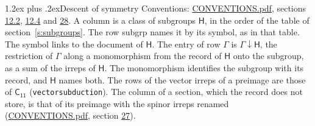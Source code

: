 \documentclass[10pt,a4paper]{article}
\makeatletter
\renewcommand\section{\@startsection{section}{1}{\z@}{-3ex plus -1ex minus -.2ex}%
  {1.2ex plus .2ex}{\normalfont\large\sffamily\bfseries\color{parttitle}}}
\numberwithin{equation}{section}
\newcommand{\grp}[1]{\mathsf{#1}}
\newcommand{\restr}[2]{#1\!\downarrow#2}
\makeatother
\begin{document}
\section{Descent of symmetry}\label{s:subduction}
Conventions: \href{../../CONVENTIONS.pdf}{CONVENTIONS.pdf}, sections \href{../../../rotation/CONVENTIONS.pdf\#conv.12.2}{12.2}, \href{../../../rotation/CONVENTIONS.pdf\#conv.12.4}{12.4} and \href{../../CONVENTIONS.pdf\#conv.28}{28}.
A column is a class of subgroups $\grp{H}$, in the order of the table of section~\ref{s:subgroups}. The row subgrp names it by its symbol, as in that table. The symbol links to the document of $\grp{H}$. The entry of row $\Gamma$ is $\restr{\Gamma}{\grp{H}}$, the restriction of $\Gamma$ along a monomorphism from the record of $\grp{H}$ onto the subgroup, as a sum of the irreps of $\grp{H}$. The monomorphism identifies the subgroup with its record, and $\grp{H}$ names both. The rows of the vector irreps of a preimage are those of \href{../../../rotation/data/pdf/C11.pdf}{$\grp{C_{11}}$} (\texttt{vectorsubduction}). The column of a section, which the record does not store, is that of its preimage with the spinor irreps renamed (\href{../../CONVENTIONS.pdf}{CONVENTIONS.pdf}, section \href{../../CONVENTIONS.pdf\#conv.27}{27}).
\end{document}
